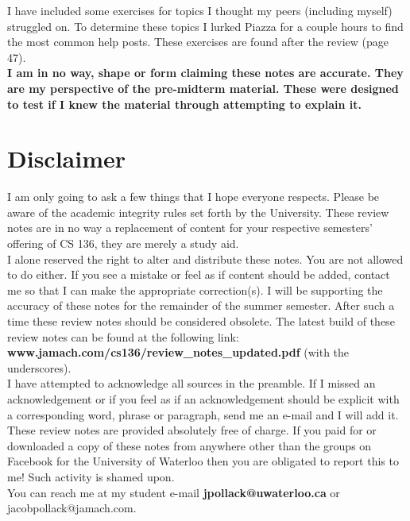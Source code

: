 \documentclass[12pt,extarticle]{article}
\begin{document}
I have included some exercises for topics I thought my peers (including myself) struggled on. To determine these topics I lurked Piazza for a couple hours to find the most common help posts. These exercises are found after the review (page 47).\\

\textbf{I am in no way, shape or form claiming these notes are accurate. They are my perspective of the pre-midterm material. These were designed to test if I knew the material through attempting to explain it.}

\newpage
\thispagestyle{empty}
\section*{Disclaimer}
I am only going to ask a few things that I hope everyone respects. Please be aware of the academic integrity rules set forth by the University. These review notes are in no way a replacement of content for your respective semesters' offering of CS 136, they are merely a study aid.\\

I alone reserved the right to alter and distribute these notes. You are not allowed to do either. If you see a mistake or feel as if content should be added, contact me so that I can make the appropriate correction(s). I will be supporting the accuracy of these notes for the remainder of the summer semester. After such a time these review notes should be considered obsolete. The latest build of these review notes can be found at the following link:\\

\textbf{www.jamach.com/cs136/review\_notes\_updated.pdf} (with the underscores).\\

I have attempted to acknowledge all sources in the preamble. If I missed an acknowledgement or if you feel as if an acknowledgement should be explicit with a corresponding word, phrase or paragraph, send me an e-mail and I will add it.\\

These review notes are provided absolutely free of charge. If you paid for or downloaded a copy of these notes from anywhere other than the groups on Facebook for the University of Waterloo then you are obligated to report this to me! Such activity is shamed upon.\\

You can reach me at my student e-mail \textbf{jpollack@uwaterloo.ca} or jacobpollack@jamach.com.
\end{document}
